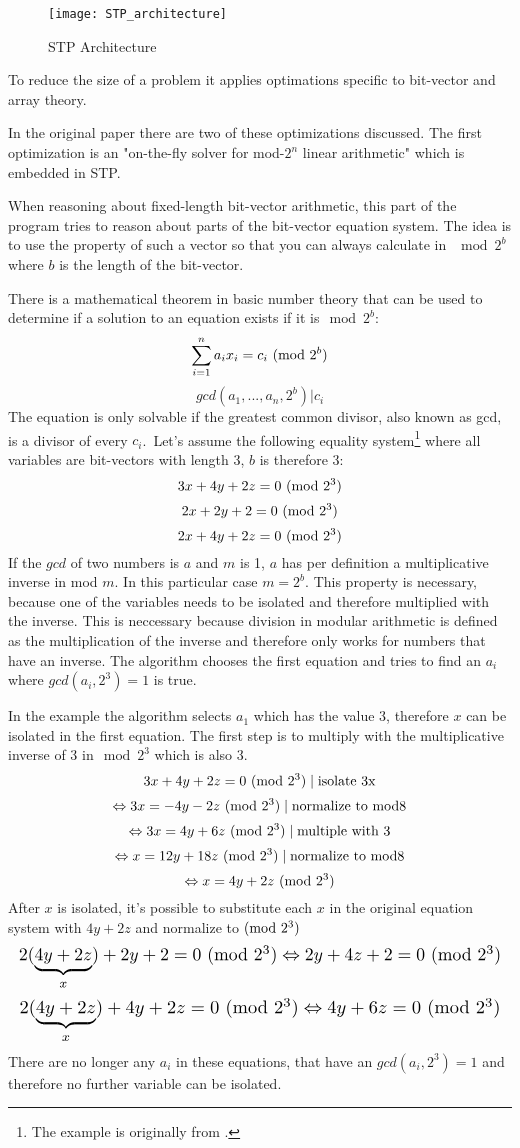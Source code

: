 \begin{figure}[h]
\texttt{[image: STP\_architecture]}
\caption{STP Architecture}
\label{fig:STP_architecture}
\end{figure}

To reduce the size of a problem it applies optimations specific to bit-vector and array theory.

In the original paper \cite{Ganesh:2007:DPB:1770351.1770421} there are two of these optimizations discussed. The first optimization is an "on-the-fly solver for mod-$2^n$ linear arithmetic" which is embedded in STP. 

When reasoning about fixed-length bit-vector arithmetic, this part of the program tries to reason about parts of the bit-vector equation system.
The idea is to use the property of such a vector so that you can always calculate in $\mod{2^b}$ where $b$ is the length of the bit-vector.

There is a mathematical theorem in basic number theory that can be used to determine if a solution to an equation exists if it is$\mod{2^b}$:
$$\sum_{i=1}^{n} a_ix_i = c_i  \ (\mathrm{mod}\ 2^b)$$
$$gcd(a_1,...,a_n,2^b) | c_i$$
The equation is only solvable if the greatest common divisor, also known as gcd, is a divisor of every $c_i$.\
Let's assume the following equality system\footnote{The example is originally from \cite{Ganesh:2007:DPB:1770351.1770421}.} where all variables are bit-vectors with length 3, $b$ is therefore 3:
$$3x+4y+2z=0 \ (\mathrm{mod}\ 2^3)$$
$$2x+2y+2=0  \ (\mathrm{mod}\ 2^3)$$
$$2x+4y+2z=0 \ (\mathrm{mod}\ 2^3)$$
If the $gcd$ of two numbers is $a$ and $m$ is 1, $a$ has per definition a multiplicative inverse in mod $m$. In this particular case $m=2^b$. This property is necessary, because one of the variables needs to be isolated and therefore multiplied with the inverse. This is neccessary because division in modular arithmetic is defined as the multiplication of the inverse and therefore only works for numbers that have an inverse.
The algorithm chooses the first equation and tries to find an $a_i$ where $gcd(a_i,2^3) = 1$ is true.

In the example the algorithm selects $a_1$ which has the value $3$, therefore $x$ can be isolated in the first equation.
The first step is to multiply with the multiplicative inverse of 3 in$\mod{2^3}$ which is also 3.
$$3x+4y+2z = 0 \ (\mathrm{mod}\ 2^3) \mid \text{isolate 3x}$$
$$\Leftrightarrow 3x=-4y-2z  \ (\mathrm{mod}\ 2^3)  \mid \text{normalize to mod8}$$
$$\Leftrightarrow 3x=4y+6z  \ (\mathrm{mod}\ 2^3)  \mid \text{multiple with 3}$$
$$\Leftrightarrow x=12y+18z \ (\mathrm{mod}\ 2^3)  \mid \text{normalize to mod8}$$
$$\Leftrightarrow x=4y+2z \ (\mathrm{mod}\ 2^3)$$
After $x$ is isolated, it's possible to substitute each $x$ in the original equation system with $4y+2z$ and normalize to$\ (\mathrm{mod}\ 2^3)$
\[\resizebox{\columnwidth}{!}{$\displaystyle
$$2(\underbrace{4y+2z}_{x})+2y+2=0 \Mod{2^3} \Leftrightarrow 2y + 4z + 2 = 0\Mod{2^3} $$
$}\]
\[\resizebox{\columnwidth}{!}{$\displaystyle
$$2(\underbrace{4y+2z}_{x})+ 4y + 2z = 0 \Mod{2^3} \Leftrightarrow 4y + 6z = 0\Mod{2^3} $$
$}\]
There are no longer any ${a_i}$ in these equations, that have an $gcd(a_i,2^3) = 1$ and therefore no further variable can be isolated.

